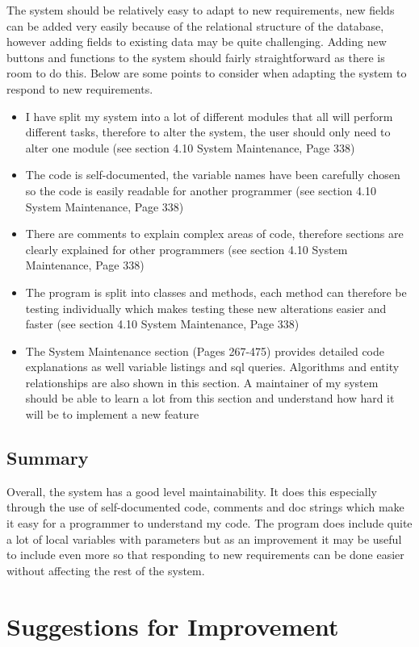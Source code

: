 The system should be relatively easy to adapt to new requirements, new fields can be added very easily because of the relational structure of the database, however adding fields to existing data may be quite challenging. Adding new buttons and functions to the system should fairly straightforward as there is room to do this. Below are some points to consider when adapting the system to respond to new requirements.
\begin{itemize}
\item{I have split my system into a lot of different modules that all will perform different tasks, therefore to alter the system, the user should only need to alter one module (see section 4.10 System Maintenance, Page 338)}
\item{The code is self-documented, the variable names have been carefully chosen so the code is easily readable for another programmer (see section 4.10 System Maintenance, Page 338)}
\item{There are comments to explain complex areas of code, therefore sections are clearly explained for other programmers  (see section 4.10 System Maintenance, Page 338)}
\item{The program is split into classes and methods, each method can therefore be testing individually which makes testing these new alterations easier and faster (see section 4.10 System Maintenance, Page 338)}
\item{The System Maintenance section (Pages 267-475) provides detailed code explanations as well variable listings and sql queries. Algorithms and entity relationships are also shown in this section. A maintainer of my system should be able to learn a lot from this section and understand how hard it will be to implement a new feature}
\end{itemize}

\subsection{Summary}

Overall, the system has a good level maintainability. It does this especially through the use of self-documented code, comments and doc strings which make it easy for a programmer to understand my code. The program does include quite a lot of local variables with parameters but as an improvement it may be useful to include even more so that responding to new requirements can be done easier without affecting the rest of the system.

\section{Suggestions for Improvement}

